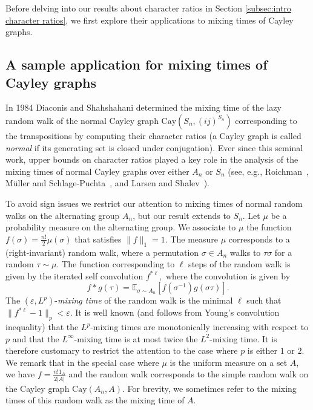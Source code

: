 \documentclass[11pt, letterpaper]{amsart}
\newcommand\eps{\varepsilon}
\renewcommand{\epsilon}{\eps}
\begin{document}
Before delving into our results about character ratios in Section \ref{subsec:intro character ratios}, we first explore their applications to mixing times of Cayley graphs.
\subsection{A sample application for mixing times of Cayley graphs}
\label{subsec:intro sample application}

In 1984 Diaconis and Shahshahani \cite{diaconis1981generating} determined the mixing time of the lazy random walk of the normal Cayley graph $\mathrm{Cay}\left(S_n, (ij)^{S_n}\right)$ corresponding to the transpositions by computing their character ratios (a Cayley graph is called \emph{normal} if its generating set is closed under conjugation). Ever since this seminal work, upper bounds on character ratios played a key role in the analysis of the mixing times of normal Cayley graphs over either $A_n$ or $S_n$ (see, e.g., Roichman~\cite{roichman1996upper}, M\"{u}ller and Schlage-Puchta~\cite{muller2007character}, and Larsen and Shalev~\cite{larsen2008characters}).

To avoid sign issues we restrict our attention to mixing times of normal random walks on the alternating group $A_n$, but our result extends to $S_n$. 
Let $\mu$ be a probability measure on the alternating group. We associate to $\mu$ the function $f(\sigma) = \frac{n!}{2}\mu(\sigma)$ that satisfies $\|f\|_1 = 1.$ The measure $\mu$ corresponds to a (right-invariant) random walk, where a permutation $\sigma\in A_n$ walks to $\tau \sigma$ for a random $\tau \sim \mu.$ The function corresponding to $\ell$ steps of the random walk is given by the iterated self convolution $f^{* \ell},$ where the convolution is given by 
\[
f*g(\tau) = \mathbb{E}_{\sigma \sim A_n}[f(\sigma^{-1})g(\sigma\tau)]. 
\]
The $(\epsilon, L^p)$-\emph{mixing time} of the random walk is the minimal $\ell$ such that $\|f^{* \ell}-1\|_{p}<\epsilon.$ It is well known (and follows from Young's convolution inequality) that the $L^p$-mixing times are monotonically increasing with respect to $p$ and that the $L^{\infty}$-mixing time is at most twice the $L^2$-mixing time. It is therefore customary to restrict the attention to the case where $p$ is either $1$ or $2.$ We remark that in the special case where $\mu$ is the uniform measure on a set $A$, we have $f=\frac{n!1_A}{2|A|}$ and the random walk corresponds to the simple random walk on the Cayley graph $\mathrm{Cay}(A_n,A)$. For brevity, we sometimes refer to the mixing times of this random walk as the mixing time of $A$.
\end{document}
